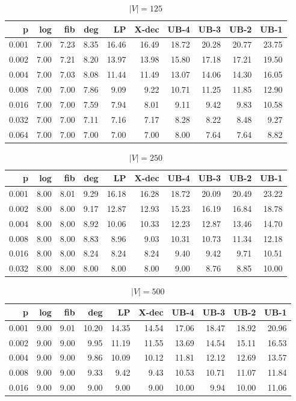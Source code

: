 \begin{table}[]
\centering
\begin{tabular}{rrrrrrrrrr}
p     & log  & fib  & deg  & LP    & X-dec & UB-4  & UB-3  & UB-2  & UB-1  \\
\hline
0.001 & 7.00 & 7.23 & 8.35 & 16.46 & 16.49 & 18.72 & 20.28 & 20.77 & 23.75 \\
0.002 & 7.00 & 7.21 & 8.20 & 13.97 & 13.98 & 15.80 & 17.18 & 17.21 & 19.50 \\
0.004 & 7.00 & 7.03 & 8.08 & 11.44 & 11.49 & 13.07 & 14.06 & 14.30 & 16.05 \\
0.008 & 7.00 & 7.00 & 7.86 & 9.09  & 9.22  & 10.71 & 11.25 & 11.85 & 12.90 \\
0.016 & 7.00 & 7.00 & 7.59 & 7.94  & 8.01  & 9.11  & 9.42  & 9.83  & 10.58 \\
0.032 & 7.00 & 7.00 & 7.11 & 7.16  & 7.17  & 8.28  & 8.22  & 8.48  & 9.27  \\
0.064 & 7.00 & 7.00 & 7.00 & 7.00  & 7.00  & 8.00  & 7.64  & 7.64  & 8.82 
\end{tabular}
\caption{$|V|=125$}
\label{tab:lbup125}
\end{table}

\begin{table}[]
\centering
\begin{tabular}{rrrrrrrrrr}
p     & log  & fib  & deg  & LP    & X-dec & UB-4  & UB-3  & UB-2  & UB-1  \\
\hline
0.001 & 8.00 & 8.01 & 9.29 & 16.18 & 16.28 & 18.72 & 20.09 & 20.49 & 23.22 \\
0.002 & 8.00 & 8.00 & 9.17 & 12.87 & 12.93 & 15.23 & 16.19 & 16.84 & 18.78 \\
0.004 & 8.00 & 8.00 & 8.92 & 10.06 & 10.33 & 12.23 & 12.87 & 13.46 & 14.70 \\
0.008 & 8.00 & 8.00 & 8.83 & 8.96  & 9.03  & 10.31 & 10.73 & 11.34 & 12.18 \\
0.016 & 8.00 & 8.00 & 8.24 & 8.24  & 8.24  & 9.40  & 9.42  & 9.71  & 10.51 \\
0.032 & 8.00 & 8.00 & 8.00 & 8.00  & 8.00  & 9.00  & 8.76  & 8.85  & 10.00
\end{tabular}
\caption{$|V|=250$}
\label{tab:lbup250}
\end{table}


\begin{table}[]
\centering
\begin{tabular}{rrrrrrrrrr}
p     & log  & fib  & deg  & LP    & X-dec & UB-4  & UB-3  & UB-2  & UB-1  \\
\hline
0.001 & 9.00 & 9.01 & 10.20 & 14.35 & 14.54 & 17.06 & 18.47 & 18.92 & 20.96 \\
0.002 & 9.00 & 9.00 & 9.95  & 11.19 & 11.55 & 13.69 & 14.54 & 15.11 & 16.53 \\
0.004 & 9.00 & 9.00 & 9.86  & 10.09 & 10.12 & 11.81 & 12.12 & 12.69 & 13.57 \\
0.008 & 9.00 & 9.00 & 9.33  & 9.42  & 9.43  & 10.53 & 10.71 & 11.07 & 11.84 \\
0.016 & 9.00 & 9.00 & 9.00  & 9.00  & 9.00  & 10.00 & 9.94  & 10.00 & 11.06
\end{tabular}
\caption{$|V|=500$}
\label{tab:lbup500}
\end{table}

